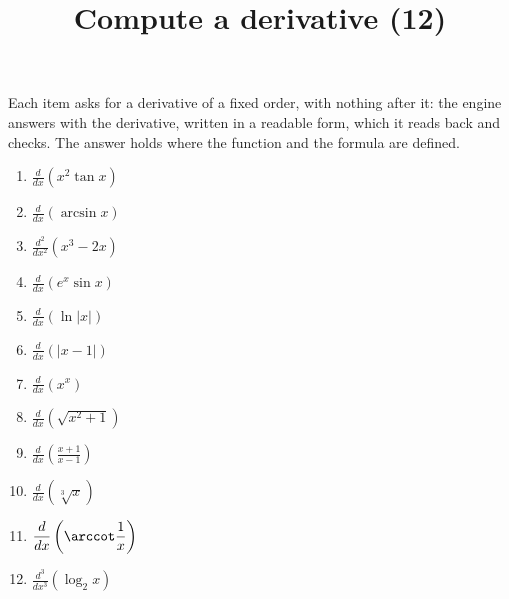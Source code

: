 \documentclass[11pt,a4paper]{article}
\title{Compute a derivative (12)}
\author{}
\date{}
\begin{document}
\maketitle
Each item asks for a derivative of a fixed order, with nothing after it: the engine answers with the derivative, written in a readable form, which it reads back and checks. The answer holds where the function and the formula are defined.

\begin{enumerate}
\item $\displaystyle \frac{d}{dx}\left( x^{2} \tan x \right)$
\item $\displaystyle \frac{d}{dx}\left( \arcsin x \right)$
\item $\displaystyle \frac{d^{2}}{dx^{2}}\left( x^{3} - 2x \right)$
\item $\displaystyle \frac{d}{dx}\left( e^{x} \sin x \right)$
\item $\displaystyle \frac{d}{dx}\left( \ln|x| \right)$
\item $\displaystyle \frac{d}{dx}\left( |x - 1| \right)$
\item $\displaystyle \frac{d}{dx}\left( x^{x} \right)$
\item $\displaystyle \frac{d}{dx}\left( \sqrt{x^{2} + 1} \right)$
\item $\displaystyle \frac{d}{dx}\left( \frac{x + 1}{x - 1} \right)$
\item $\displaystyle \frac{d}{dx}\left( \sqrt[3]{x} \right)$
\item $\displaystyle \frac{d}{dx}\left( \arccot\frac{1}{x} \right)$
\item $\displaystyle \frac{d^{3}}{dx^{3}}\left( \log_{2} x \right)$
\end{enumerate}
\end{document}
